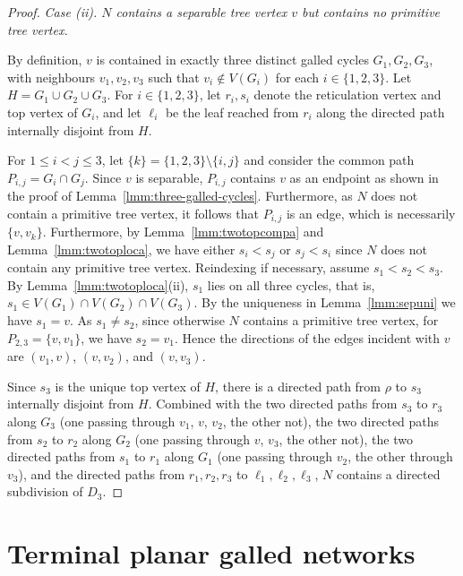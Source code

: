 \documentclass[pdflatex,sn-mathphys-num]{sn-jnl}
\theoremstyle{thmstyleone}%
\theoremstyle{thmstyletwo}%
\theoremstyle{thmstylethree}%
\begin{document}
\begin{proof}
\smallskip
\noindent\textit{Case (ii). $N$ contains a separable tree vertex $v$ but contains no primitive tree vertex.}


By definition, $v$ is contained in exactly three distinct galled cycles $G_1, G_2, G_3$, with neighbours $v_1, v_2, v_3$ such that $v_i \notin V(G_i)$ for each $i \in \{1,2,3\}$. Let $H = G_1 \cup G_2 \cup G_3$. For $i \in \{1,2,3\}$, let $r_i, s_i$ denote the reticulation vertex and top vertex of $G_i$, and let $\ell_i$ be the leaf reached from $r_i$ along the directed path internally disjoint from $H$.


For $1\le i<j\le 3$, let $\{k\}=\{1,2,3\}\setminus\{i,j\}$ and consider the common path $P_{i,j}=G_i\cap G_j$. 
Since $v$ is separable, $P_{i,j}$ contains $v$ as an endpoint as shown in the proof of Lemma~\ref{lmm:three-galled-cycles}. Furthermore, as $N$ does not contain a primitive tree vertex, it follows that $P_{i,j}$ is an edge, which is necessarily $\{v,v_k\}$.
Furthermore, by Lemma~\ref{lmm:twotopcompa} and Lemma~\ref{lmm:twotoploca}, we have either $s_i<s_j$ or $s_j<s_i$ since $N$ does not contain any primitive tree vertex. Reindexing if necessary, assume $s_1 < s_2 < s_3$. By Lemma~\ref{lmm:twotoploca}(ii), $s_1$ lies on all three cycles, that is, $s_1 \in V(G_1) \cap V(G_2) \cap V(G_3)$. By the uniqueness in Lemma~\ref{lmm:sepuni} we have $s_1 = v$. As $s_1 \neq s_2$, since otherwise $N$ contains a primitive tree vertex, for $P_{2,3}=\{v,v_1\}$, we have $s_2=v_1$. Hence the directions of the edges incident with $v$ are $(v_1,v)$, $(v,v_2)$, and $(v,v_3)$.

Since $s_3$ is the unique top vertex of $H$, there is a directed path from $\rho$ to $s_3$ internally disjoint from $H$.
Combined with the two directed paths from $s_3$ to $r_3$ along $G_3$ (one passing through $v_1$, $v$, $v_2$, the other not), the two directed paths from $s_2$ to $r_2$ along $G_2$ (one passing through $v$, $v_3$, the other not), the two directed paths from $s_1$ to $r_1$ along $G_1$ (one passing through $v_2$, the other through $v_3$), and the directed paths from $r_1, r_2, r_3$ to $\ell_1, \ell_2, \ell_3$, $N$ contains a directed subdivision of $D_3$.
\end{proof}














\section{Terminal planar galled networks} \label{sec:terminal}
\end{document}
